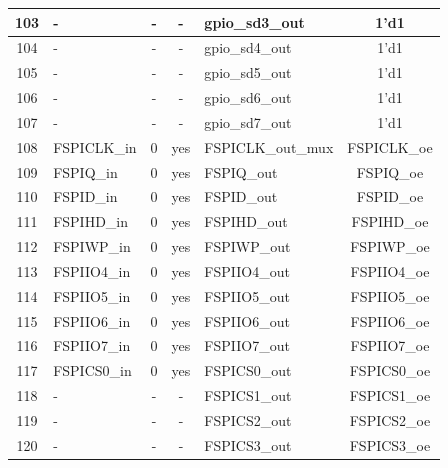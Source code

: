 \begin{longtable}[c]{|c|l|c|c|l|c|}
103  &                        -  &  -  &    -  &          gpio\_sd3\_out  &               1'd1  \\\hline
104  &                        -  &  -  &    -  &          gpio\_sd4\_out  &               1'd1  \\\hline
105  &                        -  &  -  &    -  &          gpio\_sd5\_out  &               1'd1  \\\hline
106  &                        -  &  -  &    -  &          gpio\_sd6\_out  &               1'd1  \\\hline
107  &                        -  &  -  &    -  &          gpio\_sd7\_out  &               1'd1  \\\hline
108  &              FSPICLK\_in  &  0  &  yes  &       FSPICLK\_out\_mux  &        FSPICLK\_oe  \\\hline
109  &                FSPIQ\_in  &  0  &  yes  &              FSPIQ\_out  &          FSPIQ\_oe  \\\hline
110  &                FSPID\_in  &  0  &  yes  &              FSPID\_out  &          FSPID\_oe  \\\hline
111  &               FSPIHD\_in  &  0  &  yes  &             FSPIHD\_out  &         FSPIHD\_oe  \\\hline
112  &               FSPIWP\_in  &  0  &  yes  &             FSPIWP\_out  &         FSPIWP\_oe  \\\hline
113  &              FSPIIO4\_in  &  0  &  yes  &            FSPIIO4\_out  &        FSPIIO4\_oe  \\\hline
114  &              FSPIIO5\_in  &  0  &  yes  &            FSPIIO5\_out  &        FSPIIO5\_oe  \\\hline
115  &              FSPIIO6\_in  &  0  &  yes  &            FSPIIO6\_out  &        FSPIIO6\_oe  \\\hline
116  &              FSPIIO7\_in  &  0  &  yes  &            FSPIIO7\_out  &        FSPIIO7\_oe  \\\hline
117  &              FSPICS0\_in  &  0  &  yes  &            FSPICS0\_out  &        FSPICS0\_oe  \\\hline
118  &                        -  &  -  &    -  &            FSPICS1\_out  &        FSPICS1\_oe  \\\hline
119  &                        -  &  -  &    -  &            FSPICS2\_out  &        FSPICS2\_oe  \\\hline
120  &                        -  &  -  &    -  &            FSPICS3\_out  &        FSPICS3\_oe  \\\hline

\end{longtable}
